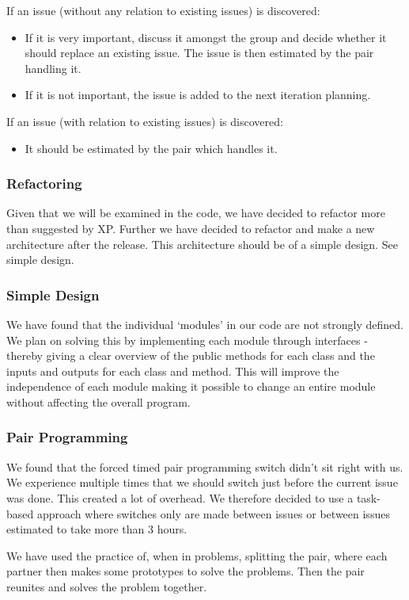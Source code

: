 If an issue (without any relation to existing issues) is discovered:
\begin{itemize}
\item If it is very important, discuss it amongst the group and decide whether it should replace an existing issue. The issue is then estimated by the pair handling it.
\item If it is not important, the issue is added to the next iteration planning.
\end{itemize}
If an issue (with relation to existing issues) is discovered:
\begin{itemize}
\item It should be estimated by the pair which handles it.
\end{itemize}

\subsubsection{Refactoring}
Given that we will be examined in the code, we have decided to refactor more than suggested by XP.
Further we have decided to refactor and make a new architecture after the release. This architecture should be of a simple design. See simple design.

\subsubsection{Simple Design}
We have found that the individual ‘modules’ in our code are not strongly defined. We plan on solving this by implementing each module through interfaces - thereby giving a clear overview of the public methods for each class and the inputs and outputs for each class and method. This will improve the independence of each module making it possible to change an entire module without affecting the overall program.

\subsubsection{Pair Programming}
We found that the forced timed pair programming switch didn’t sit right with us. We experience multiple times that we should switch just before the current issue was done. This created a lot of overhead.
We therefore decided to use a task-based approach where switches only are made between issues or between issues estimated to take more than 3 hours.

We have used the practice of, when in problems, splitting the pair, where each partner then makes some prototypes to solve the problems. Then the pair reunites and solves the problem together.


